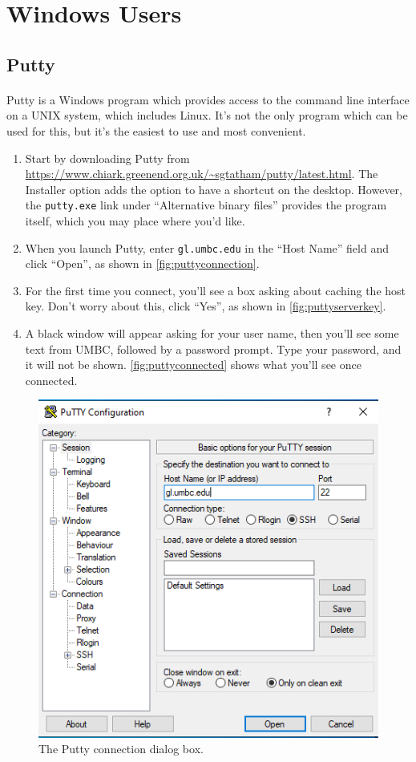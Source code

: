 \documentclass[letter,11pt]{article}
\begin{document}
\section{Windows Users}
\FloatBarrier
\subsection{Putty}
\paragraph{}Putty is a Windows program which provides access to the command line interface on a UNIX system, which includes Linux. It's not the only program which can be used for this, but it's the easiest to use and most convenient.

\begin{enumerate}
    \item Start by downloading Putty from \url{https://www.chiark.greenend.org.uk/~sgtatham/putty/latest.html}. The Installer option adds the option to have a shortcut on the desktop. However, the \texttt{putty.exe} link under ``Alternative binary files'' provides the program itself, which you may place where you'd like.
    \item When you launch Putty, enter \texttt{gl.umbc.edu} in the ``Host Name'' field and click ``Open'', as shown in \autoref{fig:puttyconnection}.
    \item For the first time you connect, you'll see a box asking about caching the host key. Don't worry about this, click ``Yes'', as shown in \autoref{fig:puttyserverkey}.
    \item A black window will appear asking for your user name, then you'll see some text from UMBC, followed by a password prompt. Type your password, and it will not be shown. \autoref{fig:puttyconnected} shows what you'll see once connected.
\end{enumerate}

\begin{figure}
\centering
\includegraphics[scale=0.6]{Images/putty_connect_1.png}
\caption{The Putty connection dialog box.}
\label{fig:puttyconnection}
\end{figure}
\end{document}

